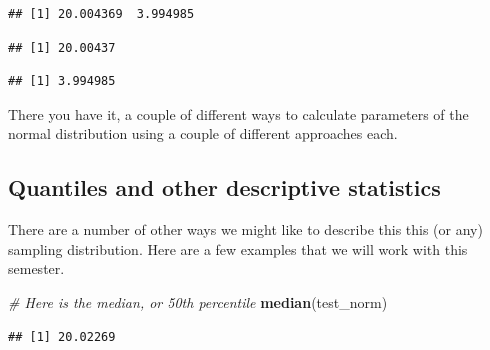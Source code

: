 \documentclass[
]{book}
\newenvironment{Shaded}{\begin{snugshade}}{\end{snugshade}}
\newcommand{\CommentTok}[1]{\textcolor[rgb]{0.56,0.35,0.01}{\textit{#1}}}
\newcommand{\DataTypeTok}[1]{\textcolor[rgb]{0.13,0.29,0.53}{#1}}
\newcommand{\DecValTok}[1]{\textcolor[rgb]{0.00,0.00,0.81}{#1}}
\newcommand{\FloatTok}[1]{\textcolor[rgb]{0.00,0.00,0.81}{#1}}
\newcommand{\KeywordTok}[1]{\textcolor[rgb]{0.13,0.29,0.53}{\textbf{#1}}}
\newcommand{\NormalTok}[1]{#1}
\newcommand{\OperatorTok}[1]{\textcolor[rgb]{0.81,0.36,0.00}{\textbf{#1}}}
\begin{document}
\begin{verbatim}
## [1] 20.004369  3.994985
\end{verbatim}

\begin{Shaded}
\end{Shaded}

\begin{verbatim}
## [1] 20.00437
\end{verbatim}

\begin{Shaded}
\end{Shaded}

\begin{verbatim}
## [1] 3.994985
\end{verbatim}

There you have it, a couple of different ways to calculate parameters of the normal distribution using a couple of different approaches each.

\hypertarget{quantiles-and-other-descriptive-statistics}{%
\subsection{Quantiles and other descriptive statistics}\label{quantiles-and-other-descriptive-statistics}}

There are a number of other ways we might like to describe this this (or any) sampling distribution. Here are a few examples that we will work with this semester.

\begin{Shaded}
\begin{Highlighting}[]
\CommentTok{# Here is the median, or 50th percentile}
\KeywordTok{median}\NormalTok{(test_norm) }
\end{Highlighting}
\end{Shaded}

\begin{verbatim}
## [1] 20.02269
\end{verbatim}

\begin{Shaded}
\end{Shaded}
\end{document}
